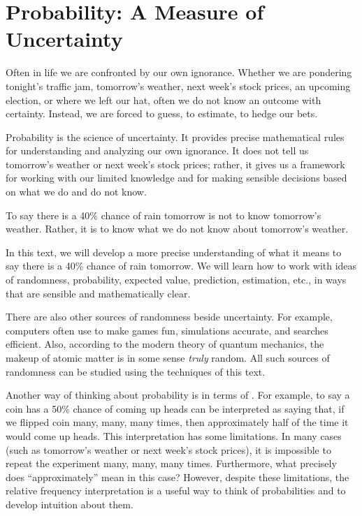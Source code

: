 \section{Probability: A Measure of Uncertainty}\label{master_of_uncertain}
Often in life we are confronted by our own ignorance. Whether we are pondering tonight's traffic jam, tomorrow's weather, next week's stock prices, an upcoming election, or where we left our hat, often we do not know an outcome with certainty. Instead, we are forced to guess, to estimate, to hedge our bets.

Probability is the science of uncertainty. It provides precise mathematical rules for understanding and analyzing our own ignorance. It does not tell us tomorrow's weather or next week's stock prices; rather, it gives us a framework for working with our limited knowledge and for making sensible decisions based on what we do and do not know.

To say there is a 40\% chance of rain tomorrow is not to know tomorrow's weather. Rather, it is to know what we do
not know about tomorrow's weather.

In this text, we will develop a more precise understanding of what it means to say there is a 40\% chance of rain
tomorrow. We will learn how to work with ideas of randomness, probability, expected value, prediction, estimation,
etc., in ways that are sensible and mathematically clear.

There are also other sources of randomness beside uncertainty. For example, computers often use  to make games fun, simulations accurate, and searches efficient. Also, according
to the modern theory of quantum mechanics, the makeup of atomic matter is in some sense \emph{truly} random. All such
sources of randomness can be studied using the techniques of this text.

Another way of thinking about probability is in terms of . For
example, to say a coin has a 50\% chance of coming up heads can be interpreted as saying that, if we flipped coin
many, many, many times, then approximately half of the time it would come up heads. This interpretation has some
limitations. In many cases (such as tomorrow's weather or next week's stock prices), it is impossible to repeat the
experiment many, many, many times. Furthermore, what precisely does ``approximately'' mean in this case? However,
despite these limitations, the relative frequency interpretation is a useful way to think of probabilities and to
develop intuition about them.

